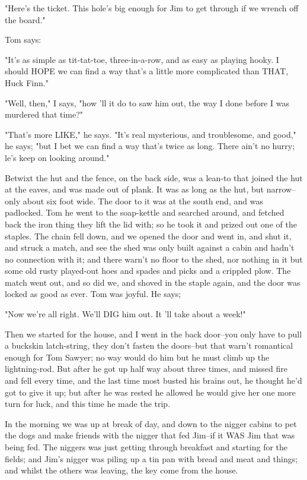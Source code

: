 "Here's the ticket.  This hole's big enough for Jim to get through if we
wrench off the board."

Tom says:

"It's as simple as tit-tat-toe, three-in-a-row, and as easy as playing
hooky.  I should HOPE we can find a way that's a little more complicated
than THAT, Huck Finn."

"Well, then," I says, "how 'll it do to saw him out, the way I done
before I was murdered that time?"

"That's more LIKE," he says.  "It's real mysterious, and troublesome, and
good," he says; "but I bet we can find a way that's twice as long.  There
ain't no hurry; le's keep on looking around."

Betwixt the hut and the fence, on the back side, was a lean-to that
joined the hut at the eaves, and was made out of plank.  It was as long
as the hut, but narrow--only about six foot wide.  The door to it was at
the south end, and was padlocked.  Tom he went to the soap-kettle and
searched around, and fetched back the iron thing they lift the lid with;
so he took it and prized out one of the staples.  The chain fell down,
and we opened the door and went in, and shut it, and struck a match, and
see the shed was only built against a cabin and hadn't no connection with
it; and there warn't no floor to the shed, nor nothing in it but some old
rusty played-out hoes and spades and picks and a crippled plow.  The
match went out, and so did we, and shoved in the staple again, and the
door was locked as good as ever. Tom was joyful.  He says;

"Now we're all right.  We'll DIG him out.  It 'll take about a week!"

Then we started for the house, and I went in the back door--you only have
to pull a buckskin latch-string, they don't fasten the doors--but that
warn't romantical enough for Tom Sawyer; no way would do him but he must
climb up the lightning-rod.  But after he got up half way about three
times, and missed fire and fell every time, and the last time most busted
his brains out, he thought he'd got to give it up; but after he was
rested he allowed he would give her one more turn for luck, and this time
he made the trip.

In the morning we was up at break of day, and down to the nigger cabins
to pet the dogs and make friends with the nigger that fed Jim--if it WAS
Jim that was being fed.  The niggers was just getting through breakfast
and starting for the fields; and Jim's nigger was piling up a tin pan
with bread and meat and things; and whilst the others was leaving, the
key come from the house.

